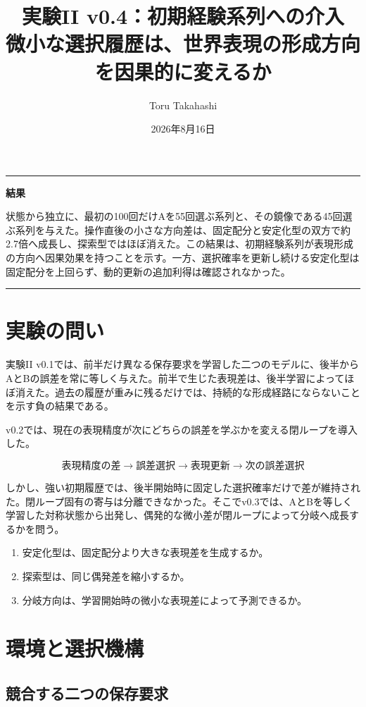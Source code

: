 \documentclass[11pt,a4paper]{ltjsarticle}
\title{\textbf{実験II v0.4：初期経験系列への介入}\\
\large 微小な選択履歴は、世界表現の形成方向を因果的に変えるか}
\author{Toru Takahashi}
\date{2026年8月16日}
\newenvironment{takeaway}{\begin{center}\begin{minipage}{0.93\linewidth}\color{Main}\hrule\vspace{6pt}\color{black}}{\vspace{6pt}\color{Main}\hrule\color{black}\end{minipage}\end{center}}
\begin{document}
\maketitle

\begin{takeaway}
\textbf{結果}

状態から独立に、最初の100回だけAを55回選ぶ系列と、その鏡像である45回選ぶ系列を与えた。操作直後の小さな方向差は、固定配分と安定化型の双方で約2.7倍へ成長し、探索型ではほぼ消えた。この結果は、初期経験系列が表現形成の方向へ因果効果を持つことを示す。一方、選択確率を更新し続ける安定化型は固定配分を上回らず、動的更新の追加利得は確認されなかった。
\end{takeaway}

\section{実験の問い}

実験II v0.1では、前半だけ異なる保存要求を学習した二つのモデルに、後半からAとBの誤差を常に等しく与えた。前半で生じた表現差は、後半学習によってほぼ消えた。過去の履歴が重みに残るだけでは、持続的な形成経路にならないことを示す負の結果である。

v0.2では、現在の表現精度が次にどちらの誤差を学ぶかを変える閉ループを導入した。

\begin{equation}
\boxed{
\text{表現精度の差}
\rightarrow
\text{誤差選択}
\rightarrow
\text{表現更新}
\rightarrow
\text{次の誤差選択}
}
\end{equation}

しかし、強い初期履歴では、後半開始時に固定した選択確率だけで差が維持された。閉ループ固有の寄与は分離できなかった。そこでv0.3では、AとBを等しく学習した対称状態から出発し、偶発的な微小差が閉ループによって分岐へ成長するかを問う。

\begin{enumerate}
\item 安定化型は、固定配分より大きな表現差を生成するか。
\item 探索型は、同じ偶発差を縮小するか。
\item 分岐方向は、学習開始時の微小な表現差によって予測できるか。
\end{enumerate}

\section{環境と選択機構}

\subsection{競合する二つの保存要求}
\end{document}
